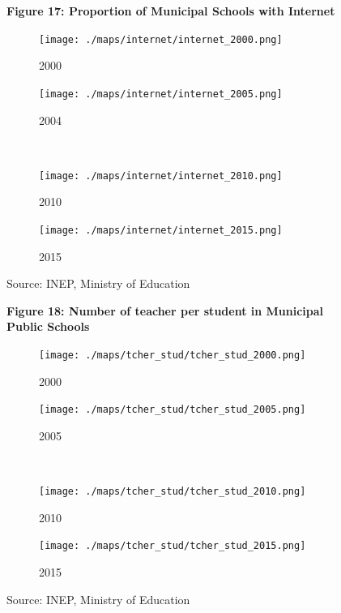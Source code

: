 \documentclass[12pt,]{article}
\begin{document}
\begin{figure}
    \centering
    \textbf{Figure 17: Proportion of Municipal Schools with Internet}
    \label{fig:map_internet}
     \begin{subfigure}{0.4\textwidth}
        \centering 
        \texttt{[image: ./maps/internet/internet\_2000.png]}
        \caption{2000}
    \end{subfigure} %
    \begin{subfigure}{0.4\textwidth}
        \centering
        \texttt{[image: ./maps/internet/internet\_2005.png]}
        \caption{2004}
    \end{subfigure} \\
    \begin{subfigure}{0.4\textwidth}
        \centering
        \texttt{[image: ./maps/internet/internet\_2010.png]}
        \caption{2010}
    \end{subfigure} %
    \begin{subfigure}{0.4\textwidth}
        \centering
        \texttt{[image: ./maps/internet/internet\_2015.png]}
        \caption{2015}
    \end{subfigure}
    \caption*{\footnotesize \hfill Source: INEP, Ministry of Education}
\end{figure}

\begin{figure}
    \centering
    \textbf{Figure 18: Number of teacher per student in Municipal Public Schools}
    \label{fig:map_tcher_stud}
     \begin{subfigure}{0.4\textwidth}
        \centering 
        \texttt{[image: ./maps/tcher\_stud/tcher\_stud\_2000.png]}
        \caption{2000}
    \end{subfigure} %
    \begin{subfigure}{0.4\textwidth}
        \centering
        \texttt{[image: ./maps/tcher\_stud/tcher\_stud\_2005.png]}
        \caption{2005}
    \end{subfigure} \\
    \begin{subfigure}{0.4\textwidth}
        \centering
        \texttt{[image: ./maps/tcher\_stud/tcher\_stud\_2010.png]}
        \caption{2010}
    \end{subfigure} %
    \begin{subfigure}{0.4\textwidth}
        \centering
        \texttt{[image: ./maps/tcher\_stud/tcher\_stud\_2015.png]}
        \caption{2015}
    \end{subfigure}
    \caption*{\footnotesize \hfill Source: INEP, Ministry of Education}
\end{figure}
\end{document}
